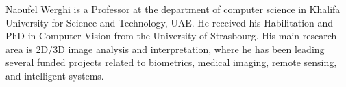 \documentclass[journal]{IEEEtran}
\begin{document}
\vspace{-12mm}
\begin{IEEEbiography}
	{Naoufel Werghi}
is a Professor at the department of computer science in Khalifa University for Science and Technology, UAE.
He received his Habilitation and PhD in Computer Vision from the University of Strasbourg.
His main research area is 2D/3D image analysis and interpretation, where he has been leading several funded projects related to biometrics, medical imaging, remote sensing, and
intelligent systems. 
\end{IEEEbiography}


\end{document}
